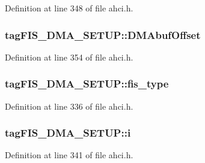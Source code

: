 Definition at line 348 of file ahci.\+h.

\subsubsection[{\texorpdfstring{D\+M\+Abuf\+Offset}{DMAbufOffset}}]{ tag\+F\+I\+S\+\_\+\+D\+M\+A\+\_\+\+S\+E\+T\+U\+P\+::\+D\+M\+Abuf\+Offset}\hypertarget{structtagFIS__DMA__SETUP_ade6c38f383cecf7d39aef0b3da265696}{}\label{structtagFIS__DMA__SETUP_ade6c38f383cecf7d39aef0b3da265696}


Definition at line 354 of file ahci.\+h.

\subsubsection[{\texorpdfstring{fis\+\_\+type}{fis_type}}]{ tag\+F\+I\+S\+\_\+\+D\+M\+A\+\_\+\+S\+E\+T\+U\+P\+::fis\+\_\+type}\hypertarget{structtagFIS__DMA__SETUP_abefd5347cafc45bdb5809e5a19dd9c1a}{}\label{structtagFIS__DMA__SETUP_abefd5347cafc45bdb5809e5a19dd9c1a}


Definition at line 336 of file ahci.\+h.

\subsubsection[{\texorpdfstring{i}{i}}]{ tag\+F\+I\+S\+\_\+\+D\+M\+A\+\_\+\+S\+E\+T\+U\+P\+::i}\hypertarget{structtagFIS__DMA__SETUP_aebe230b1fe0fb8afdc82ef964de0792e}{}\label{structtagFIS__DMA__SETUP_aebe230b1fe0fb8afdc82ef964de0792e}


Definition at line 341 of file ahci.\+h.

